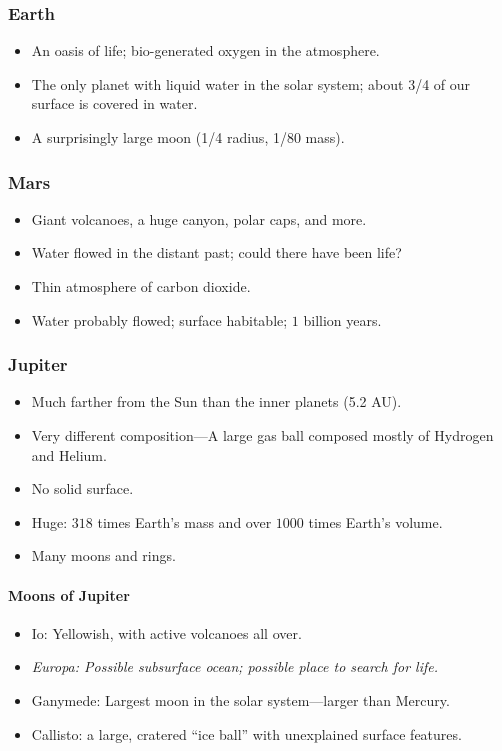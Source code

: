 \documentclass[class=article, crop=false]{standalone}
\begin{document}
  \subsubsection{Earth}
  \begin{itemize}
    \item An oasis of life; bio-generated oxygen in the atmosphere.
    \item The only planet with liquid water in the solar system; about 3/4 of our surface is covered in water.
    \item A surprisingly large moon (1/4 radius, 1/80 mass).
  \end{itemize}
  \subsubsection{Mars}
  \begin{itemize}
    \item Giant volcanoes, a huge canyon, polar caps, and more.
    \item Water flowed in the distant past; could there have been life?
    \item Thin atmosphere of carbon dioxide.
    \item Water probably flowed; surface habitable; $1$ billion years.
  \end{itemize}
  \subsubsection{Jupiter}
  \begin{itemize}
    \item Much farther from the Sun than the inner planets (5.2 AU).
    \item Very different composition---A large gas ball composed mostly of Hydrogen and Helium.
    \item No solid surface.
    \item Huge: $318$ times Earth's mass and over $1000$ times Earth's volume.
    \item Many moons and rings.
  \end{itemize}
  \paragraph{Moons of Jupiter}
  \begin{itemize}
    \item Io: Yellowish, with active volcanoes all over.
    \item \emph{Europa: Possible subsurface ocean; possible place to search for life.}
    \item Ganymede: Largest moon in the solar system---larger than Mercury.
    \item Callisto: a large, cratered ``ice ball'' with unexplained surface features.
  \end{itemize}
\end{document}
